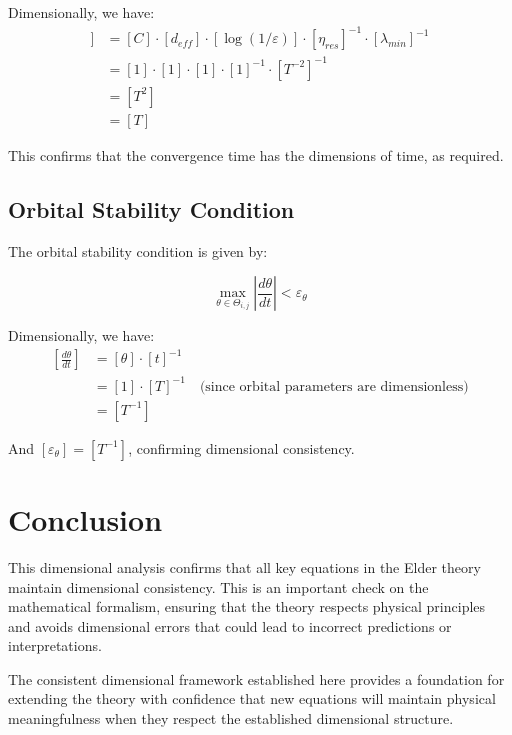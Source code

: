 Dimensionally, we have:
\begin{align}
[\mathbb{E}[T_{conv}]] &= [C] \cdot [d_{eff}] \cdot [\log(1/\varepsilon)] \cdot [\eta_{res}]^{-1} \cdot [\lambda_{min}]^{-1} \\
&= [1] \cdot [1] \cdot [1] \cdot [1]^{-1} \cdot [T^{-2}]^{-1} \\
&= [T^2] \\
&= [T]
\end{align}

This confirms that the convergence time has the dimensions of time, as required.

\subsection{Orbital Stability Condition}

The orbital stability condition is given by:

\begin{equation}
\max_{\theta \in \Theta_{i,j}} \left| \frac{d\theta}{dt} \right| < \varepsilon_{\theta}
\end{equation}

Dimensionally, we have:
\begin{align}
\left[ \frac{d\theta}{dt} \right] &= [\theta] \cdot [t]^{-1} \\
&= [1] \cdot [T]^{-1} \quad \text{(since orbital parameters are dimensionless)} \\
&= [T^{-1}]
\end{align}

And $[\varepsilon_{\theta}] = [T^{-1}]$, confirming dimensional consistency.

\section{Conclusion}

This dimensional analysis confirms that all key equations in the Elder theory maintain dimensional consistency. This is an important check on the mathematical formalism, ensuring that the theory respects physical principles and avoids dimensional errors that could lead to incorrect predictions or interpretations.

The consistent dimensional framework established here provides a foundation for extending the theory with confidence that new equations will maintain physical meaningfulness when they respect the established dimensional structure.